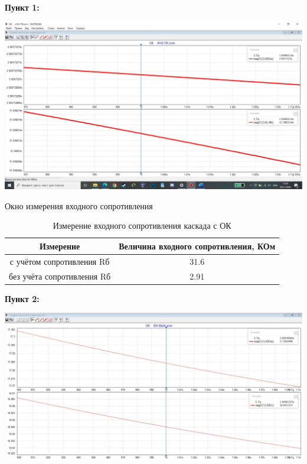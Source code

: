 \documentclass[a4paper,14pt]{extarticle}
\begin{document}
    \textbf{Пункт 1:}
    \begin{center}
        \includegraphics[scale=0.25]{1.jpg}
    \end{center}

    Окно измерения входного сопротивления 
    \begin{table}[ht]
        \begin{center}
            \caption{Измерение входного сопротивления каскада с ОК}
            \begin{tabular}{ |c|c| }
                \hline
                Измерение & Величина входного сопротивления, КОм\\
                \hline
                с учётом сопротивления Rб & 31.6\\
                \hline
                без учёта сопротивления Rб & 2.91\\
                \hline
            \end{tabular}
        \end{center}
    \end{table}

    \newpage
    \textbf{Пункт 2:}
    \begin{center}
        \includegraphics[scale=0.25]{2.jpg}
    \end{center}
\end{document}
